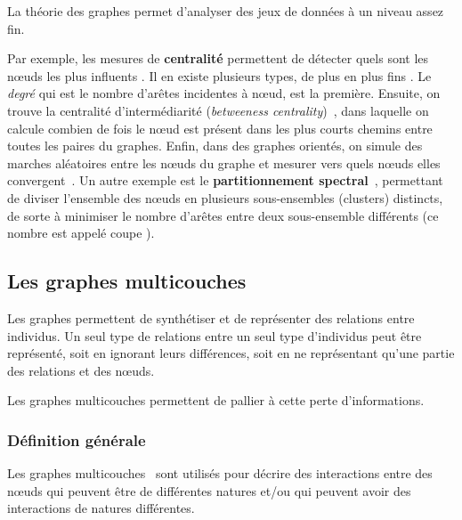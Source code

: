 \documentclass[11pt,a4paper]{article}
\theoremstyle{definition}
\theoremstyle{remark}
\theoremstyle{remark}
\begin{document}

La théorie des graphes permet d'analyser des jeux de données à un niveau assez fin.

Par exemple, les mesures de \textbf{centralité} permettent de détecter quels sont les n\oe{}uds les plus \og influents \fg{}. Il en existe plusieurs types, de plus en plus \og fins \fg{}. Le {\em degré} qui est le nombre d'arêtes incidentes à n\oe{}ud, est la première. Ensuite, on trouve la centralité d'intermédiarité ({\em betweeness centrality})~\cite{centralities}, dans laquelle on calcule combien de fois le n\oe{}ud est présent dans les plus courts chemins entre toutes les paires du graphes. Enfin, dans des graphes orientés, on simule des marches aléatoires entre les n\oe{}uds du graphe et mesurer vers quels n\oe{}uds elles convergent~\cite{pr}.
Un autre exemple est le \textbf{partitionnement spectral}~\cite{clustering}, permettant de diviser l'ensemble des n\oe{}uds en plusieurs sous-ensembles (clusters) distincts, de sorte à minimiser le nombre d'arêtes entre deux sous-ensemble différents (ce nombre est appelé \og coupe \fg{}).

\subsection{Les graphes multicouches}

Les graphes permettent de synthétiser et de représenter des relations entre individus. Un seul type de relations entre un seul type d'individus peut être représenté, soit en ignorant leurs différences, soit en ne représentant qu'une partie des relations et des n\oe{}uds. 

Les graphes multicouches permettent de pallier à cette perte d'informations.

\subsubsection{Définition générale}

 Les graphes multicouches~\cite{mlkiv} sont utilisés pour décrire des interactions entre des n\oe{}uds qui peuvent être de différentes natures et/ou qui peuvent avoir des interactions de natures différentes. 
 
\end{document}
